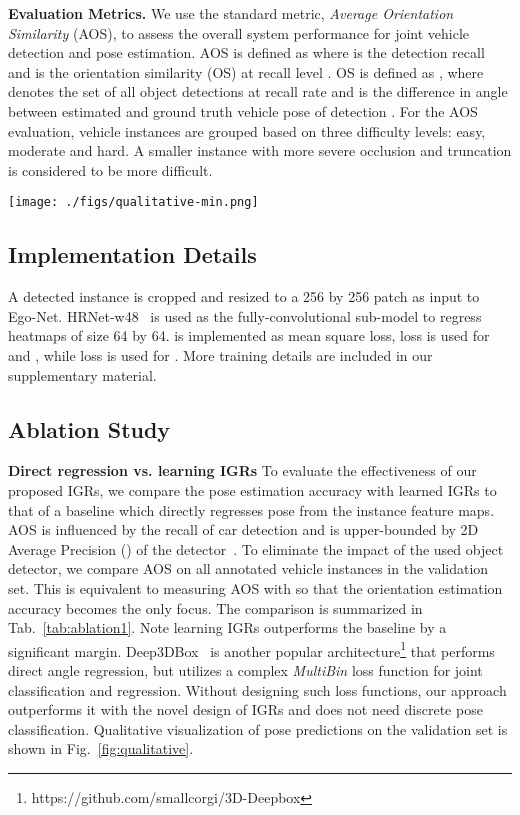 \documentclass[final]{cvpr}
\begin{document}
\noindent\textbf{Evaluation Metrics.} We use the standard metric, \emph{Average Orientation Similarity} (AOS), to assess the overall system performance for joint vehicle detection and pose estimation. AOS is defined as  where  is the detection recall and  is the orientation similarity (OS) at recall level . OS is defined as , where  denotes the set of all object detections at recall rate  and  is the difference in angle between estimated and ground truth vehicle pose of detection . For the AOS evaluation, vehicle instances are grouped based on three difficulty levels: easy, moderate and hard. A smaller instance with more severe occlusion and truncation is considered to be more difficult.
\begin{figure*}[t]
	\begin{center}
		\texttt{[image: ./figs/qualitative-min.png]}
	\end{center}
	\caption{Qualitative results on the KITTI validation set where the red arrows indicate the vehicle poses. More examples can be found in our supplementary material.}
	\label{fig:qualitative}
\end{figure*}
\subsection{Implementation Details} 
A detected instance is cropped and resized to a 256 by 256 patch as input to Ego-Net. HRNet-w48~\cite{sun2019deep, wang2020deep} is used as the fully-convolutional sub-model  to regress heatmaps of size 64 by 64.  is implemented as mean square loss,  loss is used for  and , while  loss is used for . More training details are included in our supplementary material.

\subsection{Ablation Study}
\noindent \textbf{Direct regression vs. learning IGRs} To evaluate the effectiveness of our proposed IGRs, we compare the pose estimation accuracy with learned IGRs to that of a baseline which directly regresses pose from the instance feature maps. AOS is influenced by the recall of car detection and is upper-bounded by 2D Average Precision () of the detector~\cite{geiger2012we}. To eliminate the impact of the used object detector, we compare AOS on all annotated vehicle instances in the validation set. This is equivalent to measuring AOS with  so that the orientation estimation accuracy becomes the only focus. The comparison is summarized in Tab.~\ref{tab:ablation1}. Note learning IGRs outperforms the baseline by a significant margin. Deep3DBox~\cite{mousavian20173d} is another popular architecture\footnote{https://github.com/smallcorgi/3D-Deepbox} that performs direct angle regression, but utilizes a complex \emph{MultiBin} loss function for joint classification and regression. Without designing such loss functions, our approach outperforms it with the novel design of IGRs and does not need discrete pose classification. Qualitative visualization of pose predictions on the validation set is shown in Fig.~\ref{fig:qualitative}.
\end{document}

